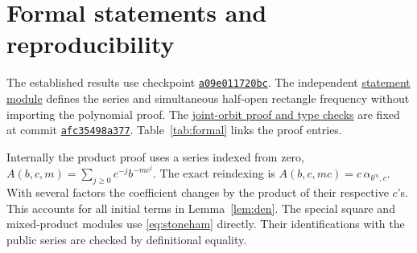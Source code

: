 \documentclass[11pt]{article}
\newcommand{\addurl}{https://github.com/eldernos/MathematicsResearch/blob/afc35498a377fce8ce1d216e820990e54c7ba32c}
\newcommand{\added}[3]{\href{\addurl/NormalityChecker/#1.lean\#L#2}{#3}}
\begin{document}
\section{Formal statements and reproducibility}

The established results use checkpoint
\href{https://github.com/eldernos/MathematicsResearch/tree/a09e011720bc74396a27f4cb3ce2d8a5b3ce5035}{\texttt{a09e011720bc}}.
The independent \added{StonehamStatements}{13}{statement module} defines the series
and simultaneous half-open rectangle frequency without importing the polynomial proof.
The \added{StonehamJoint}{196}{joint-orbit proof and type checks} are fixed at commit
\href{https://github.com/eldernos/MathematicsResearch/commit/afc35498a377fce8ce1d216e820990e54c7ba32c}{\texttt{afc35498a377}}.
Table~\ref{tab:formal} links the proof entries.

Internally the product proof uses a series indexed from zero,
$A(b,c,m)=\sum_{j\ge0} c^{-j}b^{-mc^j}$. The exact reindexing is
$A(b,c,mc)=c\,\alpha_{b^m,c}$. With several factors the coefficient
changes by the product of their respective $c$'s. This accounts for all
initial terms in Lemma~\ref{lem:den}. The special square and mixed-product
modules use \eqref{eq:stoneham} directly. Their identifications with the
public series are checked by definitional equality.
\end{document}
